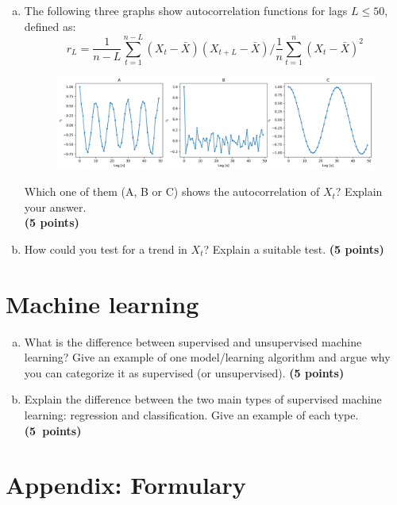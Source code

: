 \documentclass[12pt]{article}
\begin{document}
\begin{enumerate}[(a)]
\item The following three graphs show autocorrelation functions for lags $L \le 50$, defined as:
$$ r_L = \frac{1}{n-L} \sum_{t=1}^{n-L} (X_t-\bar{X}) (X_{t+L} - \bar{X}) / \frac{1}{n} \sum_{t=1}^n (X_t-\bar{X})^2$$

\begin{figure}[h!]
    \centering
    \includegraphics[width=.8\textwidth]{autocorrelation_rl} 
\end{figure}
Which one of them (A, B or C) shows the autocorrelation of $X_t$? Explain your answer. \\ \textbf{\hfill (5 points)}

\item How could you test for a trend in $X_t$? Explain a suitable test. \textbf{\hfill (5 points)}
\end{enumerate}



\pagebreak
\section{Machine learning}
\begin{enumerate}[(a)] 
\item What is the difference between supervised and unsupervised machine learning? Give an example of one model/learning algorithm and argue why you can categorize it as supervised (or unsupervised). \textbf{\hfill (5 points)}
\item Explain the difference between the two main types of supervised machine learning: regression and classification. Give an example of each type. \textbf{\hfill (5~points)}
\end{enumerate}


\section{Appendix: Formulary}


\end{document}
